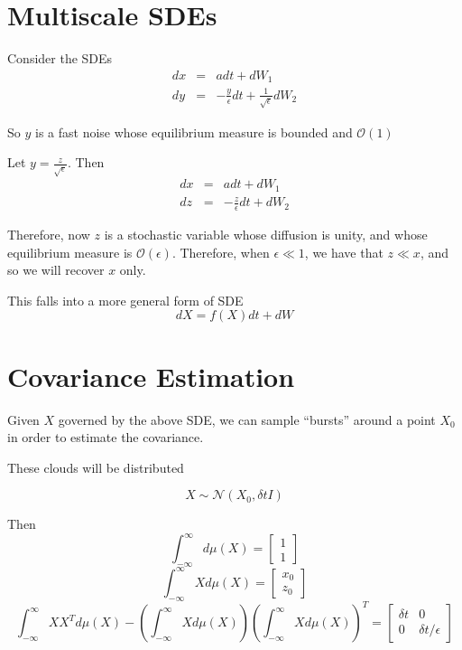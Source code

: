 \documentclass[12pt]{article}
\begin{document}
\section{Multiscale SDEs}

Consider the SDEs
\begin{eqnarray}
dx &=& adt + dW_1\\
dy &=& -\frac{y}{\epsilon} dt + \frac{1}{\sqrt{\epsilon}} dW_2
\end{eqnarray}

So $y$ is a fast noise whose equilibrium measure is bounded and $\mathcal{O}(1)$

Let $y = \frac{z}{\sqrt{\epsilon}}$. Then
\begin{eqnarray}
dx &=& adt + dW_1\\
dz &=& -\frac{z}{\epsilon} dt +  dW_2
\end{eqnarray}

Therefore, now $z$ is a stochastic variable whose diffusion is unity, and whose equilibrium measure is $\mathcal{O}(\epsilon)$. 
%
Therefore, when $\epsilon \ll 1$, we have that $z \ll x$, and so we will recover $x$ only.

This falls into a more general form of SDE
\begin{equation}
dX = f(X) dt + dW
\end{equation}


\section{Covariance Estimation}

Given $X$ governed by the above SDE, we can sample ``bursts'' around a point $X_0$ in order to estimate the covariance. 

These clouds will be distributed 

\begin{equation}
X \sim \mathcal{N}\left( X_0, \delta t I \right)
\end{equation}

Then
$$\int_{-\infty}^{\infty} d\mu(X) = \begin{bmatrix} 1 \\ 1\end{bmatrix}$$
$$\int_{-\infty}^{\infty} X d\mu(X) = \begin{bmatrix} x_0 \\ z_0\end{bmatrix}$$
$$\int_{-\infty}^{\infty} X X^T d\mu(X) - \left( \int_{-\infty}^{\infty} X d\mu(X) \right) \left( \int_{-\infty}^{\infty} X d\mu(X) \right)^T = \begin{bmatrix} \delta t & 0 \\ 0 & 
\delta t/\epsilon \end{bmatrix}$$
\end{document}
